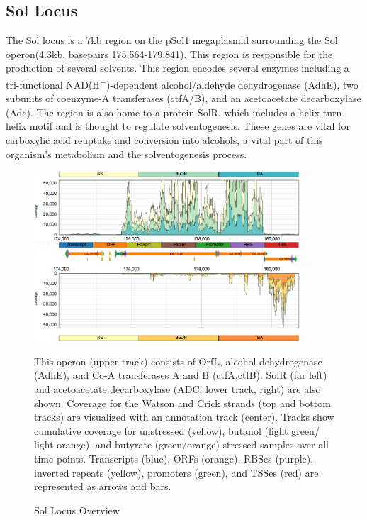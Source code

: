 \subsection{Sol Locus}

The Sol locus is a 7kb region on the pSol1 megaplasmid surrounding the Sol operon(4.3kb, basepairs 175,564-179,841). This region is responsible for the production of several solvents\cite{62,63}. This region encodes several enzymes including a tri-functional NAD(H\textsuperscript{+})-dependent alcohol/aldehyde dehydrogenase (AdhE)\cite{62}, two subunits of coenzyme-A transferases (ctfA/B)\cite{66}, and an acetoacetate decarboxylase (Adc)\cite{64,65,66}. The region is also home to a protein SolR, which includes a helix-turn-helix motif and is thought to regulate solventogenesis\cite{67}. These genes are vital for carboxylic acid reuptake and conversion into alcohols, a vital part of this organism's metabolism and the solventogenesis process.

\begin{figure}
\small
{\includegraphics[width=\textwidth,height=2.5in]{images/Assembly/Examples/Sol/Sol-locus-curated.png}
\label{fig:5.9}}
\caption{Sol Locus Overview} This operon (upper track) consists of OrfL, alcohol dehydrogenase (AdhE), and Co-A transferases A and B (ctfA,ctfB). SolR (far left) and acetoacetate decarboxylase (ADC; lower track, right) are also shown. Coverage for the Watson and Crick strands (top and bottom tracks) are visualized with an annotation track (center). Tracks show cumulative coverage for unstressed (yellow), butanol (light green/ light orange), and butyrate (green/orange) stressed samples over all time points. Transcripts (blue), ORFs (orange), RBSes (purple), inverted repeats (yellow), promoters (green), and TSSes (red) are represented as arrows and bars.
\end{figure}

